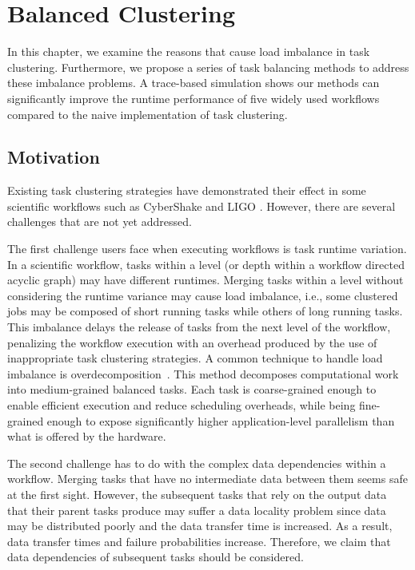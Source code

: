 \chapter{Balanced Clustering} 
\label{chap:balance}

In this chapter, we examine the reasons that cause load imbalance in task clustering. Furthermore, we propose a series of task balancing methods to address these imbalance problems. A trace-based simulation shows our methods can significantly improve the runtime performance of five widely used workflows compared to the naive implementation of task clustering.

\section{Motivation}


Existing task clustering strategies have demonstrated their effect in some scientific workflows such as CyberShake \cite{Rynge2012} and LIGO \cite{Deelman2002}. However, there are several challenges that are not yet addressed. 

The first challenge users face when executing workflows is task runtime variation. 
In a scientific workflow, tasks within a level (or depth within a workflow directed acyclic graph) may have different runtimes. Merging tasks within a level without considering the runtime variance may cause load imbalance, i.e., some clustered jobs may be composed of short running tasks while others of long running tasks. This imbalance delays the release of tasks from the next level of the workflow, penalizing the workflow execution with an overhead produced by the use of inappropriate task clustering strategies.
A common technique to handle load imbalance is overdecomposition~\cite{Lifflander2012}.
This method decomposes computational work into medium-grained balanced tasks. Each task is coarse-grained enough to enable efficient execution and reduce scheduling overheads, while being fine-grained enough to expose significantly higher application-level parallelism than what is offered by the hardware. 

The second challenge has to do with the complex data dependencies within a workflow. 
Merging tasks that have no intermediate data between them seems safe at the first sight. However, the subsequent tasks that rely on the output data that their parent tasks produce may suffer a data locality problem since data may be distributed poorly and the data transfer time is increased.  As a result, data transfer times and failure probabilities increase. Therefore, we claim that data dependencies of subsequent tasks should be considered.


